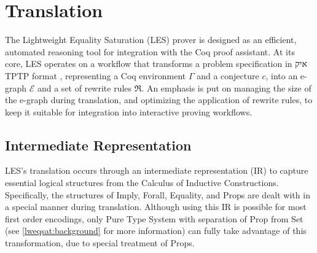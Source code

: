 \section{Translation}
\label{les:ir}




The Lightweight Equality Saturation (LES) prover is designed as an efficient, automated reasoning tool for integration with the Coq proof assistant. 
At its core, LES operates on a workflow that transforms a problem specification in איק TPTP format , representing a Coq environment $\Gamma$ and a conjecture $c$, into an e-graph $\mathcal{E}$ and a set of rewrite rules $\Re$.
An emphasis is put on managing the size of the e-graph during translation, and optimizing the application of rewrite rules, to keep it suitable for integration into interactive proving workflows.

\subsection{Intermediate Representation}

LES's translation occurs through an intermediate representation (IR) to capture essential logical structures from the Calculus of Inductive Constructions.
Specifically, the structures of Imply, Forall, Equality, and Props are dealt with in a special manner during translation.
Although using this IR is possible for most first order encodings, only Pure Type System with separation of Prop from Set (see \autoref{lweqsat:background} for more information) can fully take advantage of this transformation, due to special treatment of Props.

